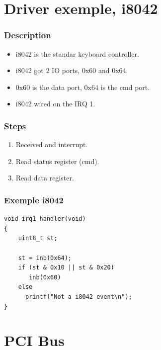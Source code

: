 \section{Driver exemple, i8042}

\begin{frame}
\frametitle{Description}
\begin{itemize}
\item i8042 is the standar keyboard controller.
\item i8042 got 2 IO ports, 0x60 and 0x64.
\item 0x60 is the data port, 0x64 is the cmd port.
\item i8042 wired on the IRQ 1.
\end{itemize}
\end{frame}

\begin{frame}
\frametitle{Steps}
\begin{enumerate}
\item Received and interrupt.
\item Read status register (cmd).
\item Read data register.
\end{enumerate}
\end{frame}

\begin{frame}[fragile]
\frametitle{Exemple i8042}
\begin{verbatim}
void irq1_handler(void)
{
    uint8_t st;

    st = inb(0x64);
    if (st & 0x10 || st & 0x20)
       inb(0x60)
    else
      printf("Not a i8042 event\n");
}
\end{verbatim}
\end{frame}


\section{PCI Bus}
